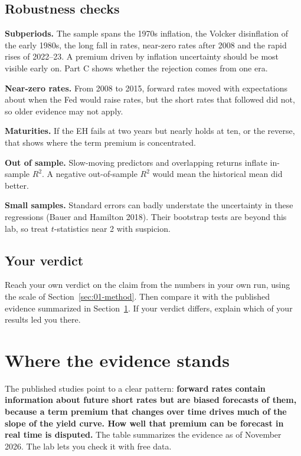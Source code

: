 \subsection{Robustness checks}
\label{sec:07-stress}

\textbf{Subperiods.} The sample spans the 1970s inflation, the Volcker disinflation of the early 1980s, the long fall in rates, near-zero rates after 2008 and the rapid rises of 2022--23. A premium driven by inflation uncertainty should be most visible early on. Part C shows whether the rejection comes from one era.

\textbf{Near-zero rates.} From 2008 to 2015, forward rates moved with expectations about when the Fed would raise rates, but the short rates that followed did not, so older evidence may not apply.

\textbf{Maturities.} If the EH fails at two years but nearly holds at ten, or the reverse, that shows where the term premium is concentrated.

\textbf{Out of sample.} Slow-moving predictors and overlapping returns inflate in-sample $R^2$. A negative out-of-sample $R^2$ would mean the historical mean did better.

\textbf{Small samples.} Standard errors can badly understate the uncertainty in these regressions (Bauer and Hamilton 2018). Their bootstrap tests are beyond this lab, so treat $t$-statistics near 2 with suspicion.

\subsection*{Your verdict}

Reach your own verdict on the claim from the numbers in your own run, using the scale of Section~\ref{sec:01-method}. Then compare it with the published evidence summarized in Section~\ref{sec:07-verdict}. If your verdict differs, explain which of your results led you there.

\section{Where the evidence stands}
\label{sec:07-verdict}

The published studies point to a clear pattern: \textbf{forward rates contain information about future short rates but are biased forecasts of them, because a term premium that changes over time drives much of the slope of the yield curve. How well that premium can be forecast in real time is disputed.} The table summarizes the evidence as of November 2026. The lab lets you check it with free data.


